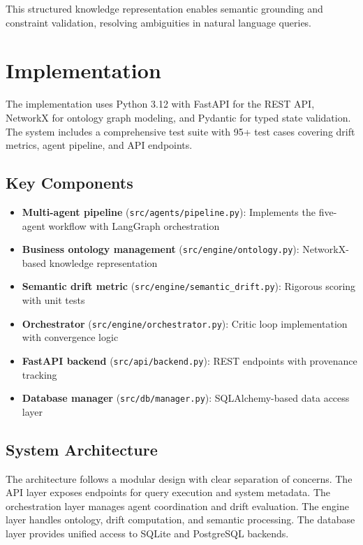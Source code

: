 \documentclass[conference]{IEEEtran}
\begin{document}
This structured knowledge representation enables semantic grounding and constraint validation, resolving ambiguities in natural language queries.

\section{Implementation}
\label{sec:implementation}

The implementation uses Python 3.12 with FastAPI for the REST API, NetworkX for ontology graph modeling, and Pydantic for typed state validation. The system includes a comprehensive test suite with 95+ test cases covering drift metrics, agent pipeline, and API endpoints.

\subsection{Key Components}

\begin{itemize}
\item \textbf{Multi-agent pipeline} (\texttt{src/agents/pipeline.py}): Implements the five-agent workflow with LangGraph orchestration
\item \textbf{Business ontology management} (\texttt{src/engine/ontology.py}): NetworkX-based knowledge representation
\item \textbf{Semantic drift metric} (\texttt{src/engine/semantic\_drift.py}): Rigorous scoring with unit tests
\item \textbf{Orchestrator} (\texttt{src/engine/orchestrator.py}): Critic loop implementation with convergence logic
\item \textbf{FastAPI backend} (\texttt{src/api/backend.py}): REST endpoints with provenance tracking
\item \textbf{Database manager} (\texttt{src/db/manager.py}): SQLAlchemy-based data access layer
\end{itemize}

\subsection{System Architecture}

The architecture follows a modular design with clear separation of concerns. The API layer exposes endpoints for query execution and system metadata. The orchestration layer manages agent coordination and drift evaluation. The engine layer handles ontology, drift computation, and semantic processing. The database layer provides unified access to SQLite and PostgreSQL backends.
\end{document}

